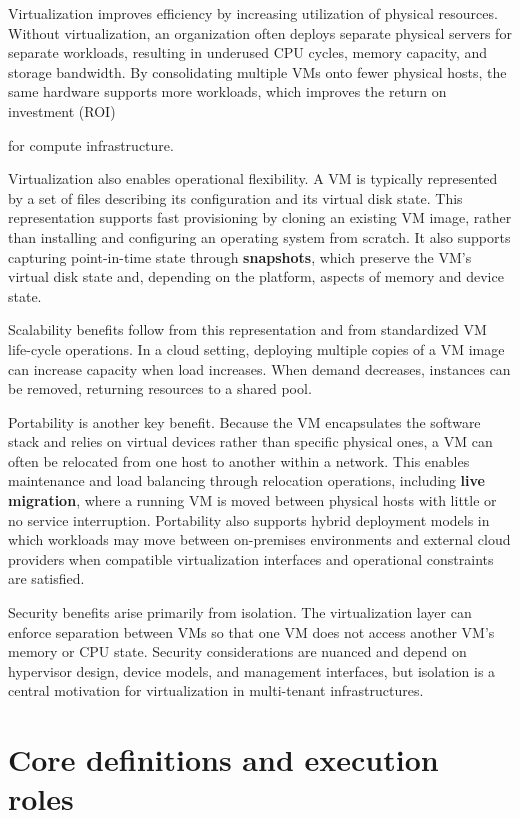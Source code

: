 \documentclass[11pt,a4paper,openany]{report}
\begin{document}
Virtualization improves efficiency by increasing utilization of physical resources. Without virtualization, an organization often deploys separate physical servers for separate workloads, resulting in underused CPU cycles, memory capacity, and storage bandwidth. By consolidating multiple VMs onto fewer physical hosts, the same hardware supports more workloads, which improves the return on investment (ROI)

for compute infrastructure.

Virtualization also enables operational flexibility. A VM is typically represented by a set of files describing its configuration and its virtual disk state. This representation supports fast provisioning by cloning an existing VM image, rather than installing and configuring an operating system from scratch. It also supports capturing point-in-time state through \textbf{snapshots}, which preserve the VM's virtual disk state and, depending on the platform, aspects of memory and device state.

Scalability benefits follow from this representation and from standardized VM life-cycle operations. In a cloud setting, deploying multiple copies of a VM image can increase capacity when load increases. When demand decreases, instances can be removed, returning resources to a shared pool.

Portability is another key benefit. Because the VM encapsulates the software stack and relies on virtual devices rather than specific physical ones, a VM can often be relocated from one host to another within a network. This enables maintenance and load balancing through relocation operations, including \textbf{live migration}, where a running VM is moved between physical hosts with little or no service interruption. Portability also supports hybrid deployment models in which workloads may move between on-premises environments and external cloud providers when compatible virtualization interfaces and operational constraints are satisfied.

Security benefits arise primarily from isolation. The virtualization layer can enforce separation between VMs so that one VM does not access another VM's memory or CPU state. Security considerations are nuanced and depend on hypervisor design, device models, and management interfaces, but isolation is a central motivation for virtualization in multi-tenant infrastructures.

\section{Core definitions and execution roles}
\end{document}
